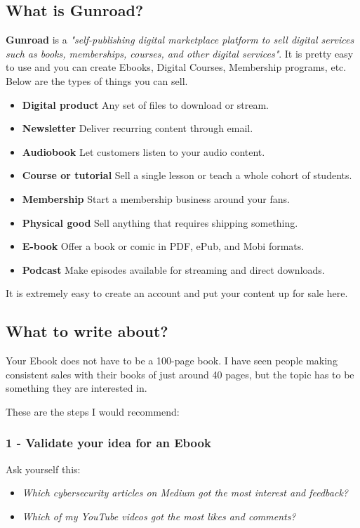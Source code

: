 \documentclass[11pt]{article}
\begin{document}
\subsection*{What is Gunroad?}
\textbf{Gunroad} is a \textit{"self-publishing digital marketplace platform to sell digital services such as books, memberships, courses, and other digital services"}. It is pretty easy to use and you can create Ebooks, Digital Courses, Membership programs, etc. Below are the types of things you can sell.

\begin{itemize}
\item \textbf{Digital product} Any set of files to download or stream.
\item \textbf{Newsletter} Deliver recurring content through email.
\item \textbf{Audiobook} Let customers listen to your audio content.
\item \textbf{Course or tutorial} Sell a single lesson or teach a whole cohort of students.
\item \textbf{Membership} Start a membership business around your fans.
\item \textbf{Physical good} Sell anything that requires shipping something.
\item \textbf{E-book} Offer a book or comic in PDF, ePub, and Mobi formats.
\item \textbf{Podcast} Make episodes available for streaming and direct downloads.
\end{itemize}

It is extremely easy to create an account and put your content up for sale here.

\subsection*{What to write about?}
Your Ebook does not have to be a 100-page book. I have seen people making consistent sales with their books of just around 40 pages, but the topic has to be something they are interested in.

These are the steps I would recommend:

\subsubsection*{1 - Validate your idea for an Ebook}
Ask yourself this:

\begin{itemize}
\item \textit{Which cybersecurity articles on Medium got the most interest and feedback?}
\item \textit{Which of my YouTube videos got the most likes and comments?}
\end{itemize}
\end{document}
